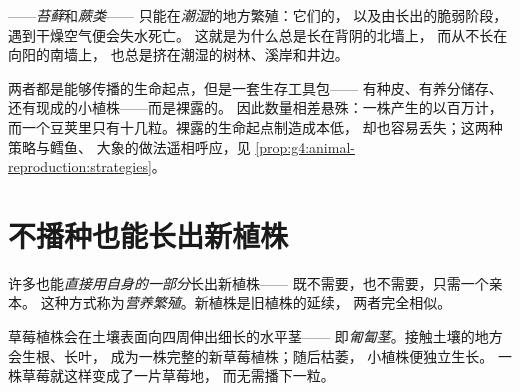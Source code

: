 \begin{proposition}[孢子植物需要潮湿]\label{prop:g4:plants-without-seeds:damp}
——\emph{苔藓}和\emph{蕨类}——
只能在\emph{潮湿}的地方繁殖：它们的，
以及由长出的脆弱阶段，遇到干燥空气便会失水死亡。
这就是为什么总是长在背阴的北墙上，
而从不长在向阳的南墙上，
也总是挤在潮湿的树林、溪岸和井边。
\end{proposition}
\admitted

\begin{remark}[孢子不是种子]\label{rem:g4:plants-without-seeds:sporeseed}
两者都是能够传播的生命起点，但是一套生存工具包——
有种皮、有养分储存、还有现成的小植株——而是裸露的。
因此数量相差悬殊：一株产生的以百万计，
而一个豆荚里只有十几粒。裸露的生命起点制造成本低，
却也容易丢失；这两种策略与鳕鱼、
大象的做法遥相呼应，见
\cref{prop:g4:animal-reproduction:strategies}。
\end{remark}

\section{不播种也能长出新植株}

\begin{definition}[营养繁殖]\label{def:g4:plants-without-seeds:vegetative}
许多也能\emph{直接用自身的一部分}长出新植株——
既不需要，也不需要，只需一个亲本。
这种方式称为\emph{营养繁殖}。新植株是旧植株的延续，
两者完全相似。
\end{definition}

\begin{example}[草莓的匍匐茎]\label{ex:g4:plants-without-seeds:runner}
草莓植株会在土壤表面向四周伸出细长的水平茎——
即\emph{匍匐茎}。接触土壤的地方会生根、长叶，
成为一株完整的新草莓植株；随后枯萎，
小植株便独立生长。
一株草莓就这样变成了一片草莓地，
而无需播下一粒。
\end{example}

